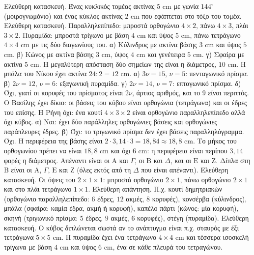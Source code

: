  Ελεύθερη κατασκευή. Ένας κυκλικός τομέας ακτίνας $5$ cm με γωνία $144^\circ$ (μοιρογνωμόνιο) και ένας κύκλος ακτίνας $2$ cm που εφάπτεται στο τόξο του τομέα.
 Ελεύθερη κατασκευή. Παραλληλεπίπεδο: μπροστά ορθογώνιο $4\times2$, πάνω $4\times3$, πλάι $3\times2$. Πυραμίδα: μπροστά τρίγωνο με βάση $4$ cm και ύψος $5$ cm, πάνω τετράγωνο $4\times4$ cm με τις δύο διαγωνίους του.
 α) Κύλινδρος με ακτίνα βάσης $3$ cm και ύψος $5$ cm. \quad β) Κώνος με ακτίνα βάσης $3$ cm, ύψος $4$ cm και γενέτειρα $5$ cm. \quad γ) Σφαίρα με ακτίνα $5$ cm. Η μεγαλύτερη απόσταση δύο σημείων της είναι η διάμετρος, $10$ cm. Η μπάλα του Νίκου έχει ακτίνα $24:2=12$ cm.
 α) $3\nu=15$, $\nu=5$: πενταγωνικό πρίσμα. \quad β) $2\nu=12$, $\nu=6$: εξαγωνική πυραμίδα. \quad γ) $2\nu=14$, $\nu=7$: επταγωνικό πρίσμα. \quad δ) Όχι, γιατί οι κορυφές του πρίσματος είναι $2\nu$, άρτιος αριθμός, και το $9$ είναι περιττός.
 Ο Βασίλης έχει δίκιο: οι βάσεις του κύβου είναι ορθογώνια (τετράγωνα) και οι έδρες του επίσης. Η Ρήνη όχι: ένα κουτί $4\times3\times2$ είναι ορθογώνιο παραλληλεπίπεδο αλλά όχι κύβος. α) Ναι: έχει δύο παράλληλες ορθογώνιες βάσεις και ορθογώνιες παράπλευρες έδρες. \quad β) Όχι: το τριγωνικό πρίσμα δεν έχει βάσεις παραλληλόγραμμα.
 Όχι. Η περιφέρεια της βάσης είναι $2\cdot3{,}14\cdot3=18{,}84\approx18{,}8$ cm. Το μήκος του ορθογωνίου πρέπει να είναι $18{,}8$ cm και όχι $6$ cm: η περιφέρεια είναι περίπου $3{,}14$ φορές η διάμετρος.
 Απέναντι είναι οι $\mathrm{Α}$ και $\Gamma$, οι $\mathrm{Β}$ και $\Delta$, και οι $\mathrm{Ε}$ και $\mathrm{Ζ}$. Δίπλα στη $\mathrm{Β}$ είναι οι $\mathrm{Α}$, $\Gamma$, $\mathrm{Ε}$ και $\mathrm{Ζ}$ (όλες εκτός από τη $\Delta$ που είναι απέναντι).
 Ελεύθερη κατασκευή. Οι όψεις του $2\times1\times1$: μπροστά ορθογώνιο $2\times1$, πάνω ορθογώνιο $2\times1$ και στο πλάι τετράγωνο $1\times1$.
 Ελεύθερη απάντηση. Π.χ. κουτί δημητριακών (ορθογώνιο παραλληλεπίπεδο: $6$ έδρες, $12$ ακμές, $8$ κορυφές), κονσέρβα (κύλινδρος), μπάλα (σφαίρα: καμία έδρα, ακμή ή κορυφή), καπέλο πάρτι (κώνος: μία κορυφή), σκηνή (τριγωνικό πρίσμα: $5$ έδρες, $9$ ακμές, $6$ κορυφές), στέγη (πυραμίδα).
 Ελεύθερη κατασκευή. Ο κύβος διπλώνεται σωστά αν το ανάπτυγμα είναι π.χ. σταυρός με έξι τετράγωνα $5\times5$ cm. Η πυραμίδα έχει ένα τετράγωνο $4\times4$ cm και τέσσερα ισοσκελή τρίγωνα με βάση $4$ cm και ύψος $6$ cm, ένα σε κάθε πλευρά του τετραγώνου.
